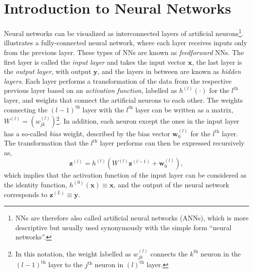 \section{Introduction to Neural Networks}
\label{sec:intro-neural-nets}
Neural networks can be visualized as interconnected layers of artificial neurons\footnote{ NNs are therefore also called artificial neural networks (ANNs), which is more descriptive but usually used synonymously with the simple form ``neural networks''.}.  illustrates a fully-connected neural network, where each layer receives inputs only from the previous layer. These types of NNs are known as \emph{feedforward} NNs.
The first layer is called the \emph{input layer} and takes the input vector $\pmb{x}$, the last layer is the \emph{output layer}, with output $\pmb{y}$, and the layers in between are known as \emph{hidden layers}. 
Each layer performs a transformation of the data from the respective previous layer based on an \emph{activation function}, labelled as $h^{(l)}(\cdot)$ for the $l^\text{th}$ layer, and weights that connect the artificial neurons to each other. The weights connecting the $(l-1)^{\text{th}}$ layer with the $l^{\text{th}}$ layer can be written as a matrix, $W^{(l)} = \left(w^{(l)}_{jk} \right)$\footnote{In this notation, the weight labelled as $w^{(l)}_{jk}$ connects the $k^\text{th}$ neuron in the $(l-1)^\text{th}$ layer to the $j^\text{th}$ neuron in $(l)^\text{th}$ layer.}. In addition, each neuron except the ones in the input layer has a so-called \emph{bias} weight, described by the bias vector $\pmb{w}^{(l)}_0$ for the $l^\text{th}$ layer.
The transformation that the $l^{\text{th}}$ layer performs can then be expressed recursively as,
\begin{equation}
    \label{eq:recursive-neuron-activation}
    \pmb{z}^{(l)} =  h^{(l)} \left( W^{(l)} \pmb{z}^{(l-1)}  + \pmb{w}^{(l)}_{0} \right),
\end{equation}
which implies that the activation function of the input layer can be considered as the identity function, $h^{(0)}(\pmb{x}) \equiv \pmb{x}$, and the output of the neural network corresponds to $ \pmb{z}^{(L)} \equiv \pmb{y}$.

